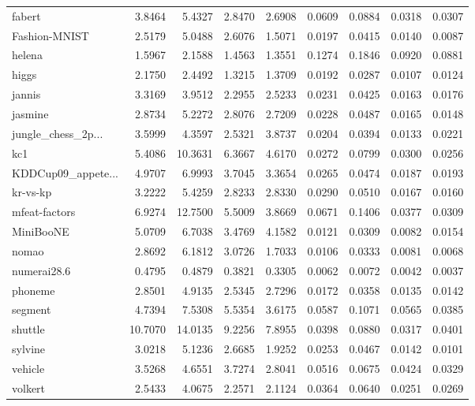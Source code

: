 \documentclass{article}
\begin{document}
\begin{table}[h]
\begin{tabular}{l*{8}{r}}
fabert & 3.8464 & 5.4327 & 2.8470 & 2.6908 & 0.0609 & 0.0884 & 0.0318 & 0.0307 \\
Fashion-MNIST & 2.5179 & 5.0488 & 2.6076 & 1.5071 & 0.0197 & 0.0415 & 0.0140 & 0.0087 \\
helena & 1.5967 & 2.1588 & 1.4563 & 1.3551 & 0.1274 & 0.1846 & 0.0920 & 0.0881 \\
higgs & 2.1750 & 2.4492 & 1.3215 & 1.3709 & 0.0192 & 0.0287 & 0.0107 & 0.0124 \\
jannis & 3.3169 & 3.9512 & 2.2955 & 2.5233 & 0.0231 & 0.0425 & 0.0163 & 0.0176 \\
jasmine & 2.8734 & 5.2272 & 2.8076 & 2.7209 & 0.0228 & 0.0487 & 0.0165 & 0.0148 \\
jungle\_chess\_2p... & 3.5999 & 4.3597 & 2.5321 & 3.8737 & 0.0204 & 0.0394 & 0.0133 & 0.0221 \\
kc1 & 5.4086 & 10.3631 & 6.3667 & 4.6170 & 0.0272 & 0.0799 & 0.0300 & 0.0256 \\
KDDCup09\_appete... & 4.9707 & 6.9993 & 3.7045 & 3.3654 & 0.0265 & 0.0474 & 0.0187 & 0.0193 \\
kr-vs-kp & 3.2222 & 5.4259 & 2.8233 & 2.8330 & 0.0290 & 0.0510 & 0.0167 & 0.0160 \\
mfeat-factors & 6.9274 & 12.7500 & 5.5009 & 3.8669 & 0.0671 & 0.1406 & 0.0377 & 0.0309 \\
MiniBooNE & 5.0709 & 6.7038 & 3.4769 & 4.1582 & 0.0121 & 0.0309 & 0.0082 & 0.0154 \\
nomao & 2.8692 & 6.1812 & 3.0726 & 1.7033 & 0.0106 & 0.0333 & 0.0081 & 0.0068 \\
numerai28.6 & 0.4795 & 0.4879 & 0.3821 & 0.3305 & 0.0062 & 0.0072 & 0.0042 & 0.0037 \\
phoneme & 2.8501 & 4.9135 & 2.5345 & 2.7296 & 0.0172 & 0.0358 & 0.0135 & 0.0142 \\
segment & 4.7394 & 7.5308 & 5.5354 & 3.6175 & 0.0587 & 0.1071 & 0.0565 & 0.0385 \\
shuttle & 10.7070 & 14.0135 & 9.2256 & 7.8955 & 0.0398 & 0.0880 & 0.0317 & 0.0401 \\
sylvine & 3.0218 & 5.1236 & 2.6685 & 1.9252 & 0.0253 & 0.0467 & 0.0142 & 0.0101 \\
vehicle & 3.5268 & 4.6551 & 3.7274 & 2.8041 & 0.0516 & 0.0675 & 0.0424 & 0.0329 \\
volkert & 2.5433 & 4.0675 & 2.2571 & 2.1124 & 0.0364 & 0.0640 & 0.0251 & 0.0269 \\
\bottomrule
\end{tabular}
\end{table}
\end{document}
